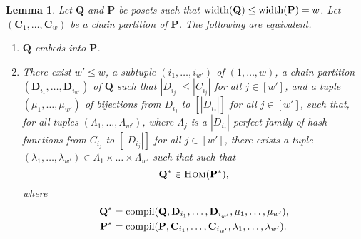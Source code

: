 \documentclass[usletter]{article}
\newcommand{\cc}{\mathbf{C}}
\newcommand{\dd}{\mathbf{D}}
\newcommand{\pp}{\mathbf{P}}
\newcommand{\qq}{\mathbf{Q}}
\newtheorem{lemma}{Lemma}
\begin{document}
\begin{lemma}
\label{lemma:correct}
Let $\qq$ and $\pp$ be posets such that $\textup{width}(\qq) \leq \textup{width}(\pp)=w$. Let $(\cc_1,\ldots,\cc_{w})$ be a chain partition of $\pp$.  The following are equivalent.
\begin{enumerate}[label=\textit{(\roman*)}] 
\item $\qq$ embeds into $\pp$. 
\item There exist $w' \leq w$, 
a subtuple $(i_1,\ldots,i_{w'})$ of $(1,\ldots,w)$, 
a chain partition $(\dd_{i_1},\ldots,\dd_{i_{w'}})$ of $\qq$ 
such that $|D_{i_j}| \leq |C_{i_j}|$ for all $j \in [w']$, 
and a tuple $(\mu_1,\ldots,\mu_{w'})$ of bijections from $D_{i_j}$ to $[|D_{i_j}|]$ for all $j \in [w']$, 
such that, for all tuples $(\Lambda_{1},\ldots,\Lambda_{w'})$, 
where $\Lambda_j$ is a $|D_{i_j}|$-perfect family of hash functions from 
$C_{i_j}$ to $[|D_{i_j}|]$ for all $j \in [w']$, 
there exists a tuple $(\lambda_1,\ldots,\lambda_{w'}) \in \Lambda_{1} \times \ldots \times \Lambda_{w'}$ such that 
such that $$\mathbf{Q}^* \in \textsc{Hom}(\mathbf{P}^*)\text{,}$$
where 
\begin{align*}
\mathbf{Q}^*&=\textup{compil}(\mathbf{Q},\dd_{i_1},\ldots,\dd_{i_{w'}},\mu_1,\ldots,\mu_{w'})\text{,}\\
\mathbf{P}^*&=\textup{compil}(\mathbf{P},\cc_{i_1},\ldots,\cc_{i_{w'}},\lambda_1,\ldots,\lambda_{w'})\text{.} 
\end{align*}
\end{enumerate}
\end{lemma}



\newcommand{\pfforwclaima}[0]{
\begin{proof}\renewcommand{\qedsymbol}{$\dashv$}[Proof of Claim~\ref{claim:forwclaim1}]
To prove the claim, let $e(Q)=\{ e(q) \mid q \in Q \}$.  Let $(i_1,i_2,\ldots,i_{w'})$ be the subtuple of $(1,2,\ldots,w)$ 
uniquely determined by deleting the index $i \in [w]$ if and only if $e(Q) \cap C_{i}=\emptyset$.  
For all $j \in [w']$, let $D_{i_j}=e^{-1}(C_{i_j})$, 
and let $\mathbf{D}_{i_j}$ be the substructure of $\mathbf{Q}$ induced by $D_{i_j}$.  
Then, $(\mathbf{D}_{i_1},\ldots,\mathbf{D}_{i_{w'}})$ is a chain partition of $\mathbf{Q}$, 
and clearly $e(D_{i_j}) \subseteq C_{i_j}$ for all $j \in [w']$, which settles the claim.
\end{proof}}
\end{document}
